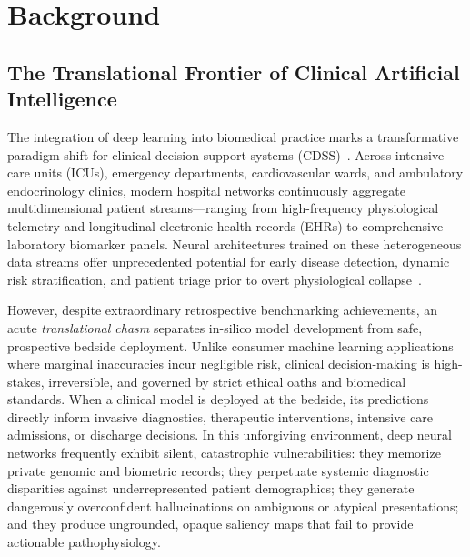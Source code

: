 \documentclass[pdflatex,sn-vancouver-num,referee,lineno]{sn-jnl}
\theoremstyle{thmstyleone}
\theoremstyle{thmstylethree}
\begin{document}

\maketitle

\section{Background}
\label{sec:intro}

\subsection{The Translational Frontier of Clinical Artificial Intelligence}
The integration of deep learning into biomedical practice marks a transformative paradigm shift for clinical decision support systems (CDSS)~\cite{topol2019high,rajkomar2018ensuring,kelly2019key}. Across intensive care units (ICUs), emergency departments, cardiovascular wards, and ambulatory endocrinology clinics, modern hospital networks continuously aggregate multidimensional patient streams---ranging from high-frequency physiological telemetry and longitudinal electronic health records (EHRs) to comprehensive laboratory biomarker panels. Neural architectures trained on these heterogeneous data streams offer unprecedented potential for early disease detection, dynamic risk stratification, and patient triage prior to overt physiological collapse~\cite{rajkomar2018ensuring,kompa2021second}.

However, despite extraordinary retrospective benchmarking achievements, an acute \emph{translational chasm} separates in-silico model development from safe, prospective bedside deployment. Unlike consumer machine learning applications where marginal inaccuracies incur negligible risk, clinical decision-making is high-stakes, irreversible, and governed by strict ethical oaths and biomedical standards. When a clinical model is deployed at the bedside, its predictions directly inform invasive diagnostics, therapeutic interventions, intensive care admissions, or discharge decisions. In this unforgiving environment, deep neural networks frequently exhibit silent, catastrophic vulnerabilities: they memorize private genomic and biometric records; they perpetuate systemic diagnostic disparities against underrepresented patient demographics; they generate dangerously overconfident hallucinations on ambiguous or atypical presentations; and they produce ungrounded, opaque saliency maps that fail to provide actionable pathophysiology.
\end{document}
